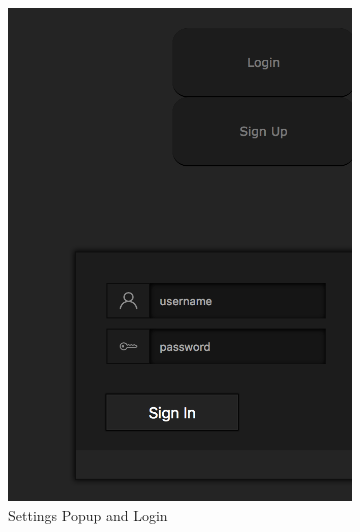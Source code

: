 \documentclass[a4paper]{article}
\begin{document}
\begin{figure}[h!]
  \centering
  \begin{subfigure}[b]{0.3\linewidth}
    \includegraphics[width=\linewidth]{images/login.png}
    \caption{Settings Popup and Login}
    \label{fig:login}
  \end{subfigure}
   \begin{subfigure}[b]{0.3\linewidth}

\end{subfigure}
\end{figure}
\end{document}
